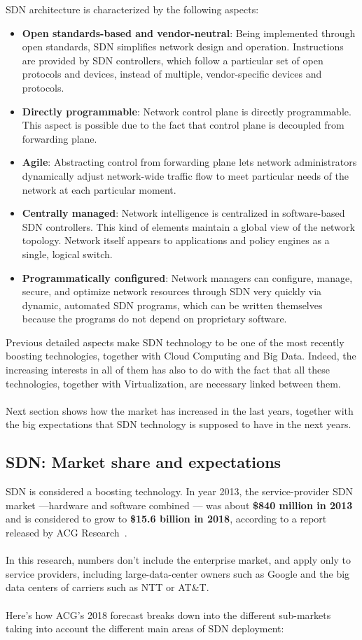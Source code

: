 \documentclass[a4paper, 12pt]{book}
\begin{document}
SDN architecture is characterized by the following aspects:
\begin{itemize}
\item{\textbf{Open standards-based and vendor-neutral}}: Being implemented through open standards, SDN simplifies network design and operation. Instructions are provided by SDN controllers, which follow a particular set of open protocols and devices, instead of multiple, vendor-specific devices and protocols.
\item{\textbf{Directly programmable}}: Network control plane is directly programmable. This aspect is possible due to the fact that control plane is decoupled from forwarding plane.
\item{\textbf{Agile}}: Abstracting control from forwarding plane lets network administrators dynamically adjust network-wide traffic flow to meet particular needs of the network at each particular moment.
\item{\textbf{Centrally managed}}: Network intelligence is centralized in software-based SDN controllers. This kind of elements maintain a global view of the network topology. Network itself appears to applications and policy engines as a single, logical switch.
\item{\textbf{Programmatically configured}}: Network managers can configure, manage, secure, and optimize network resources through SDN very quickly via dynamic, automated SDN programs, which can be written themselves because the programs do not depend on proprietary software.
\end{itemize}
Previous detailed aspects make SDN technology to be one of the most recently boosting technologies, together with Cloud Computing and Big Data. Indeed, the increasing interests in all of them has also to do with the fact that all these technologies, together with Virtualization, are necessary linked between them.\\
\\
Next section shows how the market has increased in the last years, together with the big expectations that SDN technology is supposed to have in the next years.

\subsection{SDN: Market share and expectations}
\label{subsec:sdn_marketshare}

SDN is considered a boosting technology. In year 2013, the service-provider SDN market —hardware and software combined — was about \textbf{\$840 million in 2013} and is considered to grow to \textbf{\$15.6 billion in 2018}, according to a report released by ACG Research~\cite{SDN2018expectations00}.\\
\\
In this research, numbers don’t include the enterprise market, and apply only to service providers, including large-data-center owners such as Google and the big data centers of carriers such as NTT or AT\&T.\\
\\
Here’s how ACG’s 2018 forecast breaks down into the different sub-markets taking into account the different main areas of SDN deployment:
\end{document}
